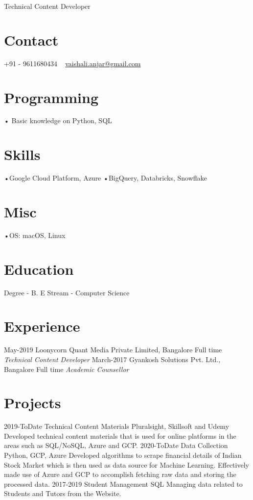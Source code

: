 \documentclass[]{kartikkumar-cv}
\begin{document}
       {Technical Content Developer}
          
\begin{aside}
  \section{Contact}
    +91 - 9611680434     
    ~
    \href{mailto:vaishali.anjar@gmail.com}{vaishali.anjar@gmail.com}
    ~
  \section{Programming}
   • Basic knowledge on Python, SQL
    ~
    \section{Skills}
    •Google Cloud Platform, Azure
    •BigQuery, Databricks, Snowflake
    \section{Misc}
   •OS: macOS, Linux
~   
  \section{Education}
  	{Degree - B. E }
  	{Stream - Computer Science }
~  	
\end{aside}

\section{Experience}

\begin{entrylist}
	\entry
	{May-2019}
	{Loonycorn Quant Media Private Limited, Bangalore}
	{Full time}
	{\emph{Technical Content Developer}}
  \entry
    {March-2017}
    {Gyankosh Solutions Pvt. Ltd., Bangalore}
    {Full time}
    {\emph{Academic Counsellor}}

\end{entrylist}

\section{Projects}

\begin{entrylist}
	\entry
	{2019-ToDate}
	{Technical Content Materials}
	{Pluralsight, Skillsoft and Udemy}
	{Developed technical content materials that is used for online platforms in the areas such as SQL/NoSQL, Azure and GCP.}
	\entry
    {2020-ToDate}
    {Data Collection}
    {Python, GCP, Azure}
    {Developed algorithms to scrape financial details of Indian Stock Market which is then used as data source for Machine Learning. Effectively made use of Azure and GCP to accomplish fetching raw data and storing the processed data.}
    \entry
    {2017-2019}
    {Student Management}
    {SQL}
    {Managing data related to Students and Tutors from the Website.}
  
    
\end{entrylist}
\end{document}
